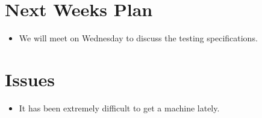 \section{Next Weeks Plan}
\begin{itemize}
	\item We will meet on Wednesday to discuss the testing
specifications.
\end{itemize}

%
%
%
\section{Issues}
\begin{itemize}
\item It has been extremely difficult to get a machine lately.
\end{itemize}



